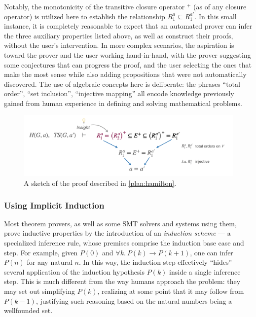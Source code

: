\begin{example}
Notably, the monotonicity of the transitive closure operator $^+$ (as of any closure operator) is utilized here to establish the relationship $R_1^a \subseteq R_1^{a'}$.
In this small instance, it is completely reasonable to expect that an automated prover can infer the three auxiliary properties listed above, as well as construct their proofs, without the user's intervention.
In more complex scenarios, the aspiration is toward the prover and the user working hand-in-hand, with the prover suggesting some conjectures that can progress the proof, and the user selecting the ones that make the most sense while also adding propositions that were not automatically discovered.
The use of algebraic concepts here is deliberate: the phrases ``total order'', ``set inclusion'', ``injective mapping'' all encode knowledge previously gained from human experience in defining and solving mathematical problems.
\end{example}


\begin{figure}
\begin{center}
\includegraphics[width=.8\textwidth]{img/topological-and-hamilton-proof-sketch.png}
\end{center}
\caption{A sketch of the proof described in \autoref{plan:hamilton}.}
\label{plan:hamilton-proof}
\end{figure}

\subsubsection{Using Implicit Induction}

Most theorem provers, as well as some SMT solvers and systems using them,
prove inductive properties by the introduction of an \emph{induction scheme} ---
a specialized inference rule, whose premises comprise the induction base case
and step.
For example, given $P(0)$ and $\forall k.~ P(k)\rightarrow P(k+1)$,
one can infer $P(n)$ for any natural $n$.
In this way, the induction step effectively ``hides'' several application of
the induction hypothesis $P(k)$ inside a single inference step.
This is much different from the way humans approach the problem: they may set
out simplifying $P(k)$, realizing at some point that it may follow from $P(k-1)$,
justifying such reasoning based on the natural numbers being a wellfounded set.

